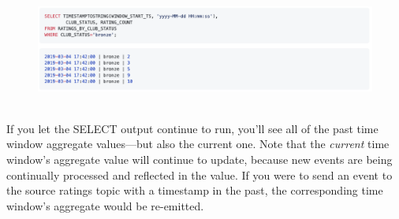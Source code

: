 \documentclass[10pt,a4paper]{article}
\begin{document}
\begin{enumerate}
   \begin{figure}[ht!]
 \hfill \includegraphics[width=400pt]{images/ksql-cmd24}\hspace*{\fill}
 \end{figure} \\
 If you let the SELECT output continue to run, you’ll see all of the past time window aggregate values—but also the current one. Note that the \textit{current} time window’s aggregate value will continue to update, because new events are being continually processed and reflected in the value. If you were to send an event to the source ratings topic with a timestamp in the past, the corresponding time window’s aggregate would be re-emitted.
 \end{enumerate}

\clearpage


  
\end{document}
